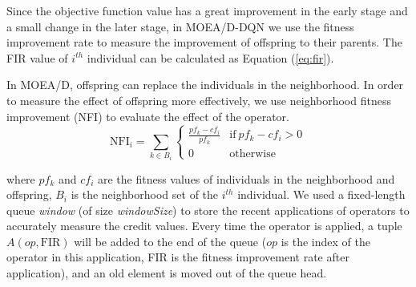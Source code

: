 \documentclass[journal]{IEEEtran}
\newcommand{\TODO}[1]{\textcolor[rgb]{1.00,0.40,0.22}{#1}}
\begin{document}
Since the objective function value has a great improvement in the early stage and a small change in the later stage, in MOEA/D-DQN we use the fitness improvement rate to measure the improvement of offspring to their parents.
The FIR value of $i^{th}$ individual can be calculated as Equation (\ref{eq:fir}).


In MOEA/D, offspring can replace the individuals in the neighborhood. In order to measure the effect of offspring more effectively, we use neighborhood fitness improvement (NFI) to evaluate the effect of the operator.
\begin{equation}
  \text{NFI}_{i}= \sum_{k \in B_i}
  \left\{
  \begin{array}{ll}
    \frac{pf_{k}-cf_{i}}{pf_{k}} & \text{if}\ pf_{k}-cf_{i}>0 \\

    0                            & \text{otherwise}
  \end{array}
  \right.
  \label{eq:nfi}
\end{equation}

where $pf_{k}$ and $cf_{i}$ are the fitness values of individuals in the neighborhood and offspring, $B_i$ is the neighborhood set of the $i^{th}$ individual.
% 
We used a fixed-length queue \textit{window} (of size \textit{windowSize}) to store the recent applications of operators to accurately measure the credit values.
Every time the operator is applied, a tuple $A (op, \text{FIR})$ will be added to the end of the queue ($op$ is the index of the operator in this application, FIR is the fitness improvement rate after application), and an old element is moved out of the queue head.
\end{document}
